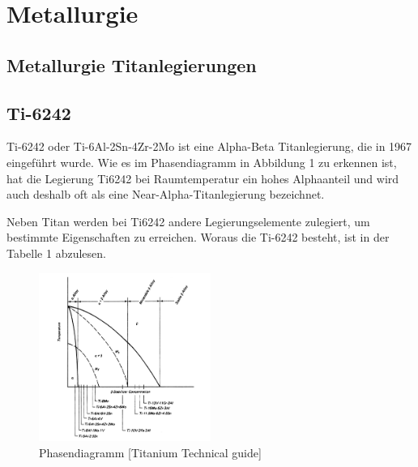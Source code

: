 \chapter{Metallurgie}	


\section{Metallurgie Titanlegierungen}
\section{Ti-6242}

Ti-6242 oder Ti-6Al-2Sn-4Zr-2Mo ist eine Alpha-Beta Titanlegierung, die  in 1967 eingeführt wurde.
Wie es im Phasendiagramm in Abbildung 1 zu erkennen ist, hat die Legierung Ti6242 bei Raumtemperatur ein hohes Alphaanteil und wird auch deshalb oft als eine Near-Alpha-Titanlegierung bezeichnet.

Neben Titan werden bei Ti6242 andere Legierungselemente zulegiert, um bestimmte Eigenschaften zu erreichen. Woraus die Ti-6242 besteht, ist in der Tabelle 1 abzulesen.


\begin{figure}[H]
	\centering
	\includegraphics[width=0.5\textwidth]{Bilder/Phasendiagram}
	\caption{Phasendiagramm [Titanium Technical guide]}
\end{figure}





